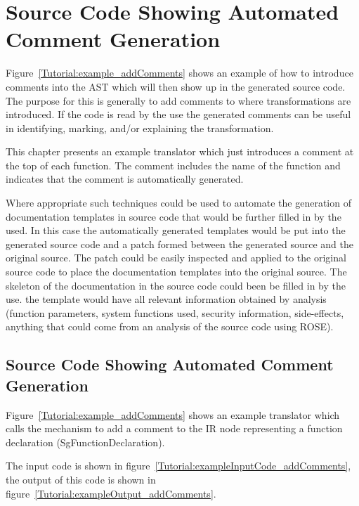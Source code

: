 \section{Source Code Showing Automated Comment Generation}

   Figure~\ref{Tutorial:example_addComments} shows an
example of how to introduce comments into the AST which will
then show up in the generated source code. The purpose for this is
generally to add comments to where transformations are introduced.
If the code is read by the use the generated comments can be
useful in identifying, marking, and/or explaining the transformation.

This chapter presents an example translator which just introduces a 
comment at the top of each function.  The comment includes the
name of the function and indicates that the comment is automatically 
generated.

Where appropriate such techniques could be used to automate the 
generation of documentation templates in source code that would be
further filled in by the used.  In this case the automatically generated
templates would be put into the generated source code and a patch formed
between the generated source and the original source.  The patch could
be easily inspected and applied to the original source code to place
the documentation templates into the original source.  The skeleton
of the documentation in the source code could been be filled in by
the use.  the template would have all relevant information obtained by analysis
(function parameters, system functions used, security information, side-effects,
anything that could come from an analysis of the source code using ROSE).

\subsection{Source Code Showing Automated Comment Generation}

    Figure~\ref{Tutorial:example_addComments}
shows an example translator which calls the mechanism to 
add a comment to the IR node representing a function declaration (SgFunctionDeclaration).

The input code is shown in figure~\ref{Tutorial:exampleInputCode_addComments},
the output of this code is shown in 
figure~\ref{Tutorial:exampleOutput_addComments}.

